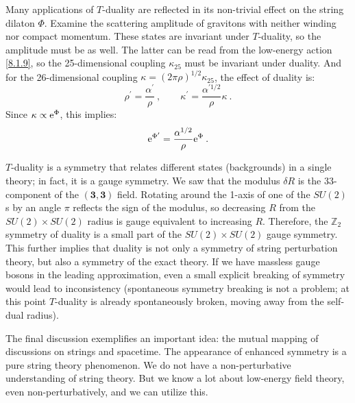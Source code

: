 Many applications of $T$-duality are reflected in its non-trivial effect on the string dilaton $\Phi$. Examine the scattering amplitude of gravitons with neither winding nor compact momentum. These states are invariant under $T$-duality, so the amplitude must be as well. 
The latter can be read from the low-energy action \eqref{8.1.9}, so the 25-dimensional coupling $\kappa_{25}$ must be invariant under duality. 
And for the 26-dimensional coupling $\kappa=(2 \pi \rho)^{1 / 2} \kappa_{25}$, 
the effect of duality is:
\begin{equation}
	\rho^{\prime}=\frac{\alpha^{\prime}}{\rho}\:, \qquad \kappa^{\prime}=\frac{\alpha^{\prime 1 / 2}}{\rho} \kappa \:. \label{8.3.30}
\end{equation}
Since $\kappa \propto \mathrm{e}^{\Phi}$, this implies:
\begin{equation}
	\mathrm{e}^{\Phi^{\prime}}=\frac{\alpha^{1 / 2}}{\rho} \mathrm{e}^{\Phi} \:. \label{8.3.31}
\end{equation}

$T$-duality is a symmetry that relates different states (backgrounds) in a single theory; in fact, it is a gauge symmetry. We saw that the modulus $\delta R$ is the 33-component of the $(\bm{3},\bm{3})$ field. 
Rotating around the 1-axis of one of the $S U(2)$s by an angle $\pi$ reflects the sign of the modulus, so decreasing $R$ from the $S U(2) \times S U(2)$ radius is gauge equivalent to increasing $R$. 
Therefore, the $\mathds{Z}_{2}$ symmetry of duality is a small part of the $S U(2) \times S U(2)$ gauge symmetry. This further implies that duality is not only a symmetry of string perturbation theory, but also a symmetry of the exact theory. 
If we have massless gauge bosons in the leading approximation, even a small explicit breaking of symmetry would lead to inconsistency (spontaneous symmetry breaking is not a problem; at this point $T$-duality is already spontaneously broken, moving away from the self-dual radius).

The final discussion exemplifies an important idea: the mutual mapping of discussions on strings and spacetime. 
The appearance of enhanced symmetry is a pure string theory phenomenon. We do not have a non-perturbative understanding of string theory. 
But we know a lot about low-energy field theory, even non-perturbatively, and we can utilize this.

